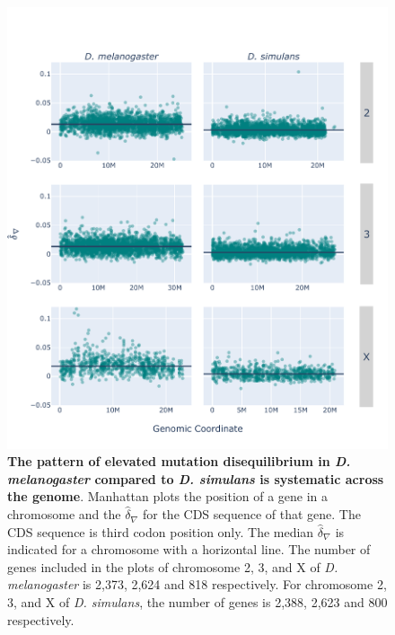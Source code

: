 \begin{figure}[htbp]
\centering
\includegraphics[width=\textwidth]{figures/plots/drosophila/d-conv_manhatten.pdf}
\caption[The pattern of elevated mutation disequilibrium in \textit{D. melanogaster} compared to \textit{D. simulans} is systematic across the genome]{\textbf{The pattern of elevated mutation disequilibrium in \textit{D. melanogaster} compared to \textit{D. simulans} is systematic across the genome}. Manhattan plots the position of a gene in a chromosome and the $\hat\delta_\nabla$ for the CDS sequence of that gene. The CDS sequence is third codon position only. The median $\hat\delta_\nabla$ is indicated for a chromosome with a horizontal line. The number of genes included in the plots of chromosome 2, 3, and X of \textit{D. melanogaster} is 2,373, 2,624 and 818 respectively. For chromosome 2, 3, and X of \textit{D. simulans}, the number of genes is 2,388, 2,623 and 800 respectively.}
\label{fig:drosophila_d-conv_manhattan}
\end{figure}
